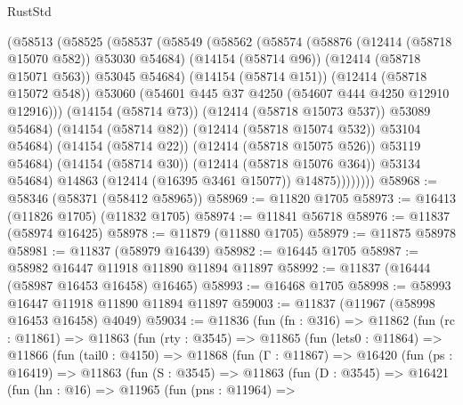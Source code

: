 \begin{lexlean}{RustStd}
\begin{coremodule}
{\begin{coremodule}
{{{{{{{{{{{{{{{{{{{{{{{{{{{{{{{{{{{{{{{{{{{{{{{{{{                    (@58513
                      (@58525
                        (@58537
                          (@58549
                            (@58562
                              (@58574
                                (@58876 (@12414 (@58718 @15070 @582)) @53030 @54684)
                                (@14154 (@58714 @96))
                                (@12414 (@58718 @15071 @563))
                                @53045
                                @54684)
                              (@14154 (@58714 @151))
                              (@12414 (@58718 @15072 @548))
                              @53060
                              (@54601 @445 @37 @4250 (@54607 @444 @4250 @12910 @12916)))
                            (@14154 (@58714 @73))
                            (@12414 (@58718 @15073 @537))
                            @53089
                            @54684)
                          (@14154 (@58714 @82))
                          (@12414 (@58718 @15074 @532))
                          @53104
                          @54684)
                        (@14154 (@58714 @22))
                        (@12414 (@58718 @15075 @526))
                        @53119
                        @54684)
                      (@14154 (@58714 @30))
                      (@12414 (@58718 @15076 @364))
                      @53134
                      @54684)
                    @14863
                    (@12414 (@16395 @3461 @15077))
                    @14875))))))))
@58968 := @58346 (@58371 (@58412 @58965))
@58969 := @11820 @1705
@58973 := @16413 (@11826 @1705) (@11832 @1705)
@58974 := @11841 @56718
@58976 := @11837 (@58974 @16425)
@58978 := @11879 (@11880 @1705)
@58979 := @11875 @58978
@58981 := @11837 (@58979 @16439)
@58982 := @16445 @1705
@58987 := @58982 @16447 @11918 @11890 @11894 @11897
@58992 := @11837 (@16444 (@58987 @16453 @16458) @16465)
@58993 := @16468 @1705
@58998 := @58993 @16447 @11918 @11890 @11894 @11897
@59003 := @11837 (@11967 (@58998 @16453 @16458) @4049)
@59034 := @11836
    (fun (fn : @316) =>
    @11862
      (fun (rc : @11861) =>
      @11863
        (fun (rty : @3545) =>
        @11865
          (fun (lets0 : @11864) =>
          @11866
            (fun (tail0 : @4150) =>
            @11868
              (fun (Γ : @11867) =>
              @16420
                (fun (ps : @16419) =>
                @11863
                  (fun (S : @3545) =>
                  @11863
                    (fun (D : @3545) =>
                    @16421
                      (fun (hn : @16) =>
                      @11965
                        (fun (pns : @11964) =>
}}}}}}}}}}}}}}}}}}}}}}}}}}}}}}}}}}}}}}}}}}}}}}}}}}
\end{coremodule}}
\end{coremodule}
\end{lexlean}
